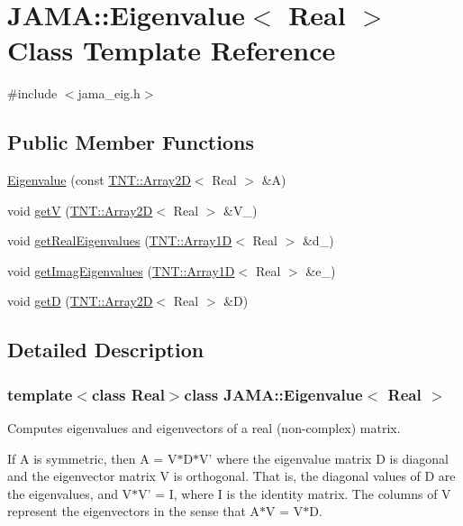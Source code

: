 \hypertarget{classJAMA_1_1Eigenvalue}{\section{J\-A\-M\-A\-:\-:Eigenvalue$<$ Real $>$ Class Template Reference}
\label{classJAMA_1_1Eigenvalue}
}


{\ttfamily \#include $<$jama\-\_\-eig.\-h$>$}

\subsection*{Public Member Functions}
\begin{DoxyCompactItemize}
\item 
\hyperlink{classJAMA_1_1Eigenvalue_a28bf3e2df18bcd3d3f3b0979630953b3}{Eigenvalue} (const \hyperlink{classTNT_1_1Array2D}{T\-N\-T\-::\-Array2\-D}$<$ Real $>$ \&A)
\item 
void \hyperlink{classJAMA_1_1Eigenvalue_ad01bfc213b887979f8f702acdd0a76c2}{get\-V} (\hyperlink{classTNT_1_1Array2D}{T\-N\-T\-::\-Array2\-D}$<$ Real $>$ \&V\-\_\-)
\item 
void \hyperlink{classJAMA_1_1Eigenvalue_aae525e0f58b9ea03f183a4a75b46af50}{get\-Real\-Eigenvalues} (\hyperlink{classTNT_1_1Array1D}{T\-N\-T\-::\-Array1\-D}$<$ Real $>$ \&d\-\_\-)
\item 
void \hyperlink{classJAMA_1_1Eigenvalue_ad72ed4bd3a07325097a1ef4e36a0480f}{get\-Imag\-Eigenvalues} (\hyperlink{classTNT_1_1Array1D}{T\-N\-T\-::\-Array1\-D}$<$ Real $>$ \&e\-\_\-)
\item 
void \hyperlink{classJAMA_1_1Eigenvalue_aee57a1213656385928a3fb2c6a21e4b2}{get\-D} (\hyperlink{classTNT_1_1Array2D}{T\-N\-T\-::\-Array2\-D}$<$ Real $>$ \&D)
\end{DoxyCompactItemize}


\subsection{Detailed Description}
\subsubsection*{template$<$class Real$>$class J\-A\-M\-A\-::\-Eigenvalue$<$ Real $>$}

Computes eigenvalues and eigenvectors of a real (non-\/complex) matrix. 

If A is symmetric, then A = V$\ast$\-D$\ast$\-V' where the eigenvalue matrix D is diagonal and the eigenvector matrix V is orthogonal. That is, the diagonal values of D are the eigenvalues, and V$\ast$\-V' = I, where I is the identity matrix. The columns of V represent the eigenvectors in the sense that A$\ast$\-V = V$\ast$\-D.

